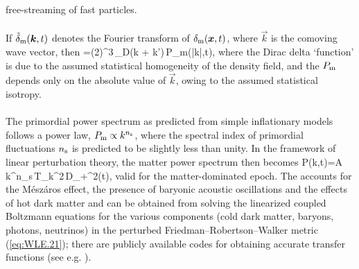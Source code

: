 {free-streaming of fast particles.
\\
\\
If $\tilde\delta_{\rm m}(\vec k,t)$ denotes  the Fourier transform of
$\delta_{\rm m}(\vec x,t)$, where $\vec k$ is the comoving wave
vector, then
%
\be
{}
=(2\pi)^3\,\delta_{\rm D}(\vec k + \vec k')\,P_{\rm m}(|\vec k|,t)\;,
\label{eq:LSS.6}
\ee
%
where the Dirac delta `function' is due to the assumed statistical
homogeneity of the density field, and the  $P_{\rm m}$ depends only on the
absolute value of $\vec k$, owing to the assumed statistical isotropy.
\\
\\
The primordial power spectrum as predicted from simple inflationary
models follows a power law, $P_{\rm m}\propto k^{n_{\rm s}}$, where
the spectral index of primordial fluctuations $n_{\rm s}$ is predicted
to be slightly less than unity.  In the framework of linear
perturbation theory, the matter power spectrum then becomes
%
\be
P(k,t)=A\,k^{n_{\rm s}}\,T_k^2\,D_+^2(t)\;,
\label{eq:LSS.7}
\ee
%
valid for the matter-dominated epoch. The  accounts for the M\'esz\'aros
effect, the presence of baryonic acoustic oscillations and the effects
of hot dark matter and can be obtained from solving the linearized
coupled Boltzmann equations for the various components (cold dark
matter, baryons, photons, neutrinos) in the perturbed
Friedman--Robertson--Walker metric (\ref{eq:WLE.21}); there are publicly
available codes for obtaining accurate transfer functions (see e.g. \citep{1999ApJ...511....5E}).}
